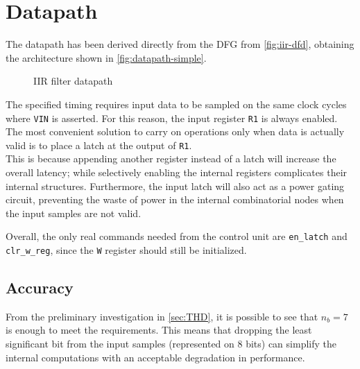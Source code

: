 \section{Datapath}
The datapath has been derived directly from the DFG from \autoref{fig:iir-dfd}, obtaining the architecture shown in \autoref{fig:datapath-simple}.

\begin{figure}[htbp]
	\centering
	\caption{IIR filter datapath}
	\label{fig:datapath-simple}
\end{figure}

The specified timing requires input data to be sampled on the same clock cycles where \texttt{VIN} is asserted. For this reason, the input register \texttt{R1} is always enabled. The most convenient solution to carry on operations only when data is actually valid is to place a latch at the output of \texttt{R1}.\\
This is because appending another register instead of a latch will increase the overall latency; while selectively enabling the internal registers complicates their internal structures. Furthermore, the input latch will also act as a power gating circuit, preventing the waste of power in the internal combinatorial nodes when the input samples are not valid.

Overall, the only real commands needed from the control unit are \texttt{en\_latch} and \texttt{clr\_w\_reg}, since the \texttt{W} register should still be initialized.

\subsection{Accuracy}
From the preliminary investigation in \autoref{sec:THD}, it is possible to see that $n_b=7$ is enough to meet the requirements. This means that dropping the least significant bit from the input samples (represented on 8 bits) can simplify the internal computations with an acceptable degradation in performance.


